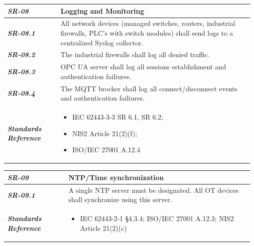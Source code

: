 \begin{tabularx}{\textwidth}{>{\bfseries}p{2.5cm} X}
    \textit{SR-08} & \textbf{Logging and Monitoring} \vspace{0.5em}\\
\toprule
\textit{SR-08.1} &
    All network devices (managed switches, routers, industrial firewalls, PLC's with switch modules) shall send logs to a centralized Syslog collector.
    \vspace{0.5em}
\\
\textit{SR-08.2} &
    The industrial firewalls shall log all denied traffic.
    \vspace{0.5em}
    \\
\textit{SR-08.3} &
    OPC UA server shall log all sessions establishment and authentication failiures.
    \vspace{0.5em}
    \\
\textit{SR-08.4} &
    The MQTT brocker shall log all connect/disconnect events and authentication failiures.
    \vspace{0.5em}
    \\
\midrule
    \textit{Standards Reference} &
\begin{itemize}[label=-, noitemsep, topsep=0pt, leftmargin=*]
    \item IEC 62443-3-3 SR 6.1, SR 6.2;
    \item NIS2 Article 21(2)(f); 
    \item ISO/IEC 27001 A.12.4
\end{itemize} \vspace{1em} \\ 
\end{tabularx}
\vspace{2em}

\begin{tabularx}{\textwidth}{>{\bfseries}p{2.5cm} X}
    \textit{SR-09} & \textbf{NTP/Time synchronization} \vspace{0.5em}\\
\toprule
\textit{SR-09.1} &
    A single NTP server must be designated. All OT devices shall synchronize using this server.
    \vspace{0.5em}
\\
\midrule
    \textit{Standards Reference} &
\begin{itemize}[label=-, noitemsep, topsep=0pt, leftmargin=*]
    \item IEC 62443-2-1 §4.3.4; ISO/IEC 27001 A.12.3; NIS2 Article 21(2)(c)
\end{itemize} \vspace{1em} \\ 
\end{tabularx}
\vspace{2em}

